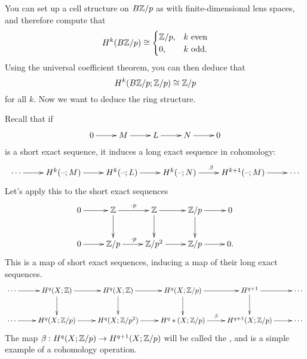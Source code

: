You can set up a cell structure on $B\mathbb Z/p$ as with finite-dimensional lens spaces, and therefore compute that
\[H^k(B\mathbb Z/p) \cong\begin{cases}
	\mathbb Z/p, &k\text{ even}\\
	0, &k\text{ odd.}
\end{cases}\]
Using the universal coefficient theorem, you can then deduce that
\[H^k(B\mathbb Z/p;\mathbb Z/p) \cong \mathbb Z/p\]
for all $k$. Now we want to deduce the ring structure.

Recall that if
\[\shortexact{M}{L}{N}{}\]
is a short exact sequence, it induces a long exact sequence in cohomology:
\[\xymatrix{
	\dotsb\ar[r] & H^k(\bl;M)\ar[r] &H^k(\bl;L)\ar[r] &H^k(\bl;N)\ar[r]^\beta &H^{k+1}(\bl;M)\ar[r] & \dotsb
}\]
Let's apply this to the short exact sequences
\[\xymatrix{
	0\ar[r] & \Z\ar[r]^{\cdot p}\ar[d]&\Z\ar[r]\ar[d] & \Z/p\ar[r]\ar[d] &0\\
	0\ar[r] & \Z/p\ar[r]^{\cdot p} &\Z/p^2\ar[r] & \Z/p\ar[r] &0.
}\]
This is a map of short exact sequences, inducing a map of their long exact sequences.
\begin{equation}
\begin{gathered}
\xymatrix{
	\dotsb\ar[r] & H^q(X;\Z)\ar[r]\ar[d] & H^q(X;\Z)\ar[r]\ar[d] & H^q(X;\Z/p)\ar[r]\ar[d] & H^{q+1}\ar[r]\ar[d] &
	\dotsb\\
	\dotsb\ar[r] & H^q(X;\Z/p)\ar[r] & H^q(X;\Z/p^2)\ar[r] & H^q*(X;\Z/p)\ar[r]^\beta &H^{q+1}(X;\Z/p)\ar[r] &
	\dotsb
}
\end{gathered}
\end{equation}
The map $\beta:H^q(X;\mathbb Z/p)\to H^{q+1}(X;\mathbb Z/p)$ will be called the , and is a simple
example of a cohomology operation.

